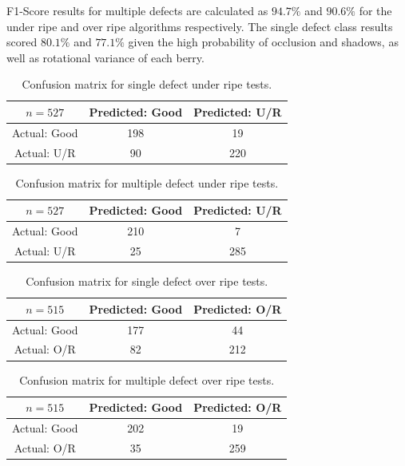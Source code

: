 \documentclass[fleqn,twoside,12pt]{report}
\begin{document}
F1-Score results for multiple defects are calculated as $94.7\%$ and $90.6\%$ for the under ripe and over ripe algorithms respectively. The single defect class results scored $80.1\%$ and $77.1\%$ given the high probability of occlusion and shadows, as well as rotational variance of each berry.


\begin{table}
	\centering
	\caption{Confusion matrix for single defect under ripe tests.}
	\label{tab:confusion_1}
	\begin{tabular}{ccc}
		\toprule
		$n=527$ & Predicted: Good & Predicted: U/R  \\ 
		\midrule
		Actual: Good   & 198 & 19    \\[6pt] 
		Actual: U/R	   & 90  & 220  \\[6pt] 
		\bottomrule
	\end{tabular}
\end{table}

\begin{table}
	\centering
	\caption{Confusion matrix for multiple defect under ripe tests.}
	\label{tab:confusion_2}
	\begin{tabular}{ccc}
		\toprule
		$n=527$ & Predicted: Good & Predicted: U/R  \\ 
		\midrule
		Actual: Good   & 210 & 7    \\[6pt] 
		Actual: U/R	   & 25  & 285  \\[6pt] 
		\bottomrule
	\end{tabular}
\end{table}

\begin{table}
	\centering
	\caption{Confusion matrix for single defect over ripe tests.}
	\label{tab:confusion_3}
	\begin{tabular}{ccc}
		\toprule
		$n=515$ & Predicted: Good & Predicted: O/R  \\ 
		\midrule
		Actual: Good   & 177 & 44    \\[6pt] 
		Actual: O/R	   & 82  & 212  \\[6pt] 
		\bottomrule
	\end{tabular}
\end{table}

\begin{table}
	\centering
	\caption{Confusion matrix for multiple defect over ripe tests.}
	\label{tab:confusion_4}
	\begin{tabular}{ccc}
		\toprule
		$n=515$ & Predicted: Good & Predicted: O/R  \\ 
		\midrule
		Actual: Good   & 202 & 19    \\[6pt] 
		Actual: O/R	   & 35  & 259  \\[6pt] 
		\bottomrule
	\end{tabular}
\end{table}
\end{document}
